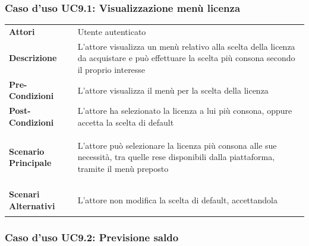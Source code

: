 \subsubsection{Caso d'uso UC9.1: Visualizzazione menù licenza}
\label{UC9_1}

\begin{minipage}{\linewidth}
	\begin{tabular}{ l | p{11cm}}
		\hline
		\rowcolor{Gray}
		\multicolumn{2}{c}{UC9.1 - Visualizzazione menù licenza} \\
		\hline
		\textbf{Attori} & Utente autenticato \\
		\textbf{Descrizione} & L'attore visualizza un menù relativo alla scelta della licenza da acquistare e può effettuare la scelta più consona secondo il proprio interesse\\
		\textbf{Pre-Condizioni} & L'attore visualizza il menù per la scelta della licenza\\
		\textbf{Post-Condizioni} & L'attore ha selezionato la licenza a lui più consona, oppure accetta la scelta di default \\
		\textbf{Scenario Principale} & 
		\begin{enumerate*}[label=(\arabic*.),itemjoin={\newline}]
			\item L'attore può selezionare la licenza più consona alle sue necessità, tra quelle rese disponibili dalla piattaforma, tramite il menù preposto
		\end{enumerate*}\\
		\textbf{Scenari Alternativi} & 
		\begin{enumerate*}[label=(\arabic*.),itemjoin={\newline}]
			\item L'attore non modifica la scelta di default, accettandola
		\end{enumerate*}\\
	\end{tabular}
\end{minipage}

\subsubsection{Caso d'uso UC9.2: Previsione saldo}
\label{UC9_2}

